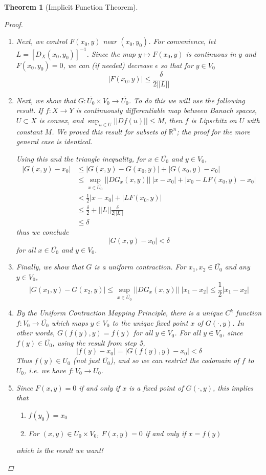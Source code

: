 \documentclass[12pt]{amsart}         %
\newtheorem{theorem}{Theorem}[section]
\theoremstyle{remark}
\newcommand{\R}{\mathbb{R}}
\begin{document}
\begin{theorem}[Implicit Function Theorem]
\begin{proof}
\begin{enumerate}
\item Next, we control $F(x_0, y)$ near $(x_0, y_0)$. For convenience, let $L = [D_X(x_0, y_0)]^{-1}$. Since  the map $y \mapsto F(x_0, y)$ is continuous in $y$ and $F(x_0, y_0) = 0$, we can (if needed) decrease $\epsilon$ so that for $y \in V_0$
\[
|F(x_0, y)| \leq \frac{\delta}{2 ||L||}
\]

\item Next, we show that $G: \overline{U_0} \times V_0 \rightarrow \overline{U_0}$. To do this we will use the following result. If $f: X \rightarrow Y$ is continuously differentiable map between Banach spaces, $U \subset X$ is convex, and $\sup_{u \in U} ||Df(u)|| \leq M$, then $f$ is Lipschitz on $U$ with constant $M$. We proved this result for subsets of $\R^n$; the proof for the more general case is identical.

Using this and the triangle inequality, for $x \in \overline{U_0}$ and $y \in V_0$,
\begin{align*}
|G(x, y) - x_0| &\leq |G(x, y) - G(x_0, y)| + |G(x_0, y) - x_0| \\
&\leq \sup_{x\in \overline{U_0}}||DG_x(x, y)||\:|x - x_0| + |x_0 - L F(x_0, y) - x_0 | \\
&< \frac{1}{2} |x - x_0| + |L F(x_0, y)| \\
&\leq \frac{\delta}{2} + ||L|| \frac{\delta}{2 ||L||} \\
&\leq \delta
\end{align*} 
thus we conclude
\[
|G(x, y) - x_0| < \delta
\]
for all $x \in \overline{U_0}$ and $y \in V_0$.

\item Finally, we show that $G$ is a uniform contraction. For $x_1, x_2 \in \overline{U_0}$ and any $y \in V_0$,
\[
|G(x_1, y) - G(x_2, y)| \leq \sup_{x\in \overline{U_0}}||DG_x(x, y)||\:|x_1 - x_2| \leq \frac{1}{2}|x_1 - x_2|
\]

\item By the Uniform Contraction Mapping Principle, there is a unique $C^k$ function $f: V_0 \rightarrow \overline{U_0}$ which maps $y \in V_0$ to the unique fixed point $x$ of $G(\cdot, y)$. In other words, $G(f(y),y) = f(y)$ for all $y \in V_0$. For all $y \in V_0$, since $f(y) \in \overline{U_0}$, using the result from step 5,
\[
|f(y) - x_0| = |G(f(y), y) - x_0| < \delta
\]
Thus $f(y) \in U_0$ (not just $\overline{U_0}$), and so we can restrict the codomain of $f$ to $U_0$, i.e. we have $f: V_0 \rightarrow U_0$.

\item Since $F(x, y) = 0$ if and only if $x$ is a fixed point of $G(\cdot, y)$, this implies that 
	\begin{enumerate}
	\item $f(y_0) = x_0$
	\item For $(x, y) \in U_0 \times V_0$, $F(x, y) = 0$ if and only if $x = f(y)$
	\end{enumerate}
which is the result we want!


\end{enumerate}
\end{proof}
\end{theorem}
\end{document}
